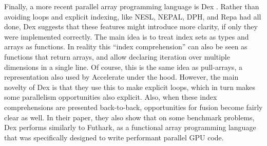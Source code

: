         Finally, a more recent parallel array programming language is Dex \cite{maclaurin2019dex,paszke2021getting}.
        Rather than avoiding loops and explicit indexing, like NESL, NEPAL, DPH, and Repa had all done, Dex suggests that these features might introduce more clarity, if only they were implemented correctly.
        The main idea is to treat index sets as types and arrays as functions.
        In reality this ``index comprehension'' can also be seen as functions that return arrays, and allow declaring iteration over multiple dimensions in a single line.
        Of course, this is the same idea as pull-arrays, a representation also used by Accelerate under the hood.
        However, the main novelty of Dex is that they use this to make explicit loops, which in turn makes some parallelism opportunities also explicit.
        Also, when these index comprehensions are presented back-to-back, opportunities for fusion become fairly clear as well.
        In their paper, they also show that on some benchmark problems, Dex performs similarly to Futhark, as a functional array programming language that was specifically designed to write performant parallel GPU code.
